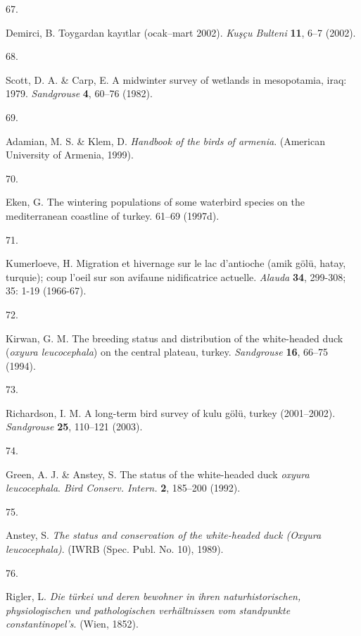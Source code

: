 \documentclass[
  letterpaper,
  DIV=11,
  numbers=noendperiod]{scrreprt}
\newlength{\cslhangindent}
\newlength{\csllabelwidth}
\newenvironment{CSLReferences}[2] %
 {\begin{list}{}{%
  \setlength{\itemindent}{0pt}
  \setlength{\leftmargin}{0pt}
  \setlength{\parsep}{0pt}
  \ifodd #1
   \setlength{\leftmargin}{\cslhangindent}
   \setlength{\itemindent}{-1\cslhangindent}
  \fi
  \setlength{\itemsep}{#2\baselineskip}}}
 {\end{list}}
\newcommand{\CSLLeftMargin}[1]{\parbox[t]{\csllabelwidth}{\strut#1\strut}}
\newcommand{\CSLRightInline}[1]{\parbox[t]{\linewidth - \csllabelwidth}{\strut#1\strut}}
\begin{document}
\begin{CSLReferences}{0}{0}
\CSLLeftMargin{67. }%
\CSLRightInline{Demirci, B. Toygardan kayıtlar (ocak--mart 2002).
\emph{Kuşçu Bulteni} \textbf{11}, 6--7 (2002).}

\CSLLeftMargin{68. }%
\CSLRightInline{Scott, D. A. \& Carp, E. A midwinter survey of wetlands
in mesopotamia, iraq: 1979. \emph{Sandgrouse} \textbf{4}, 60--76
(1982).}

\CSLLeftMargin{69. }%
\CSLRightInline{Adamian, M. S. \& Klem, D. \emph{Handbook of the birds
of armenia}. (American University of Armenia, 1999).}

\CSLLeftMargin{70. }%
\CSLRightInline{Eken, G. The wintering populations of some waterbird
species on the mediterranean coastline of turkey. 61--69 (1997d).}

\CSLLeftMargin{71. }%
\CSLRightInline{Kumerloeve, H. Migration et hivernage sur le lac
d'antioche (amik gölü, hatay, turquie); coup l'oeil sur son avifaune
nidificatrice actuelle. \emph{Alauda} \textbf{34}, 299-308; 35: 1-19
(1966-67).}

\CSLLeftMargin{72. }%
\CSLRightInline{Kirwan, G. M. The breeding status and distribution of
the white-headed duck (\emph{oxyura leucocephala}) on the central
plateau, turkey. \emph{Sandgrouse} \textbf{16}, 66--75 (1994).}

\CSLLeftMargin{73. }%
\CSLRightInline{Richardson, I. M. A long-term bird survey of kulu gölü,
turkey (2001--2002). \emph{Sandgrouse} \textbf{25}, 110--121 (2003).}

\CSLLeftMargin{74. }%
\CSLRightInline{Green, A. J. \& Anstey, S. The status of the
white-headed duck \emph{oxyura leucocephala}. \emph{Bird Conserv.
Intern.} \textbf{2}, 185--200 (1992).}

\CSLLeftMargin{75. }%
\CSLRightInline{Anstey, S. \emph{The status and conservation of the
white-headed duck ({Oxyura leucocephala})}. (IWRB (Spec. Publ. No. 10),
1989).}

\CSLLeftMargin{76. }%
\CSLRightInline{Rigler, L. \emph{Die türkei und deren bewohner in ihren
naturhistorischen, physiologischen und pathologischen verhältnissen vom
standpunkte constantinopel's}. (Wien, 1852).}


\end{CSLReferences}
\end{document}
